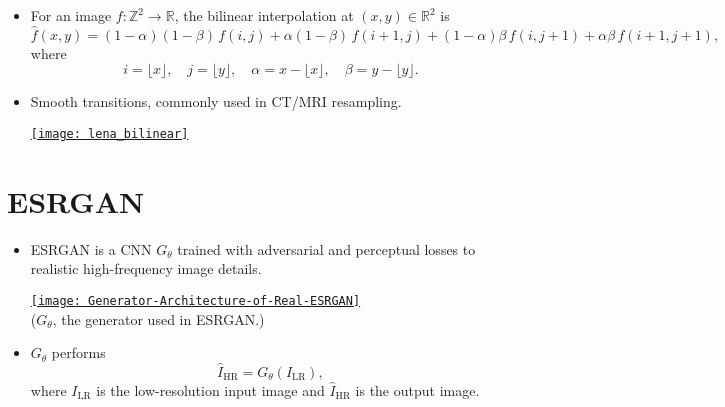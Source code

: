 \begin{itemize}
\item For an image $f: \mathbb{Z}^2 \to \mathbb{R}$, the bilinear interpolation at 
$(x,y) \in \mathbb{R}^2$ is
\begin{equation}
\hat{f}(x,y) = (1-\alpha)(1-\beta)\, f(i,j) 
+ \alpha(1-\beta)\, f(i+1,j) 
+ (1-\alpha)\beta\, f(i,j+1) 
+ \alpha\beta\, f(i+1,j+1),
\end{equation}
where
\[
i = \lfloor x \rfloor, \quad j = \lfloor y \rfloor, \quad
\alpha = x - \lfloor x \rfloor, \quad \beta = y - \lfloor y \rfloor.
\]
  \newpage
\item Smooth transitions, commonly used in \gls{CT}/\gls{MRI} resampling.
\begin{center}
  \href{https://github.com/vicente-gonzalez-ruiz/medical_imaging/blob/main/notebooks/bilinear_interpolation.ipynb}{\texttt{[image: lena\_bilinear]}}
\end{center}
\end{itemize}

\section{\gls{ESRGAN}}
\begin{itemize}
\item ESRGAN is a  \gls{CNN}
  $G_\theta$ trained with adversarial and perceptual losses to
   realistic high-frequency image
  details.
  \vspace{-2ex}
  \begin{center}
    \href{https://arxiv.org/abs/2207.08036}{\texttt{[image: Generator-Architecture-of-Real-ESRGAN]}}\\
    \vspace{-1ex}
    ($G_\theta$, the generator used in \gls{ESRGAN}.)
  \end{center}

\item $G_\theta$ performs
  \begin{equation}
    \hat{I}_{\text{HR}} = G_\theta(I_{\text{LR}}),
  \end{equation}
  where $I_{\text{LR}}$ is the low-resolution input image and
  $\hat{I}_{\text{HR}}$ is the  output image.
\end{itemize}

